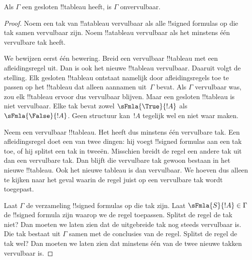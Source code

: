 \documentclass[../../../include/open-logic-section]{subfiles}
\begin{document}
\begin{thm}[Correctheid]
  Als $\Gamma$ een gesloten !!{tableau} heeft, is $\Gamma$
  onvervulbaar.
\end{thm}

\begin{proof}
Noem een tak van !!a{tableau} vervulbaar als alle !!{signed formula}s
op die tak samen vervulbaar zijn. Noem !!a{tableau} vervulbaar als het
minstens één vervulbare tak heeft.

We bewijzen eerst één bewering. Breid een vervulbaar !!{tableau} met
een afleidingsregel uit. Dan is ook het nieuwe !!{tableau} vervulbaar.
Daaruit volgt de stelling. Elk gesloten !!{tableau} ontstaat namelijk
door afleidingsregels toe te passen op het !!{tableau} dat alleen
aannamen uit~$\Gamma$ bevat. Als $\Gamma$ vervulbaar was, zou elk
!!{tableau} ervoor dus vervulbaar blijven. Maar een gesloten
!!{tableau} is niet vervulbaar. Elke tak bevat zowel
$\sFmla{\True}{!A}$ als $\sFmla{\False}{!A}$. Geen structuur kan~$!A$
tegelijk wel en niet waar maken.

Neem een vervulbaar !!{tableau}. Het heeft dus minstens één vervulbare
tak. Een afleidingsregel doet een van twee dingen: hij voegt
!!{signed formula}s aan een tak toe, of hij splitst een tak in tweeën.
Misschien breidt de regel een andere tak uit dan een vervulbare tak.
Dan blijft die vervulbare tak gewoon bestaan in het nieuwe
!!{tableau}. Ook het nieuwe tableau is dan vervulbaar. We hoeven dus
alleen te kijken naar het geval waarin de regel juist op een
vervulbare tak wordt toegepast.

Laat $\Gamma$ de verzameling !!{signed formula}s op die tak zijn. Laat
$\sFmla{S}{!A} \in \Gamma$ de !!{signed formula} zijn waarop we de
regel toepassen. Splitst de regel de tak niet? Dan moeten we laten zien
dat de uitgebreide tak nog steeds vervulbaar is. Die tak bestaat uit
$\Gamma$ samen met de conclusies van de regel. Splitst de regel de tak
wel? Dan moeten we laten zien dat minstens één van de twee nieuwe
takken vervulbaar is.
  

\end{proof}
\end{document}
